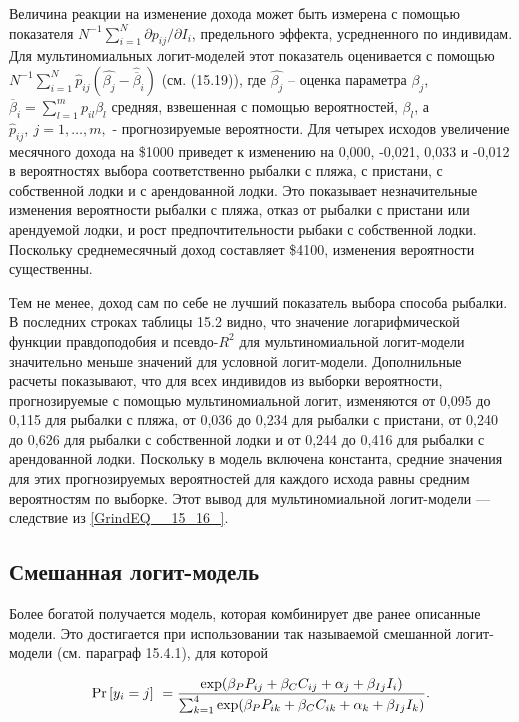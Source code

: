 Величина реакции на изменение дохода может быть измерена с помощью показателя $N^{-1}\sum^N_{i=1}{{\partial p_{ij}}/{\partial I_i}}$, предельного эффекта, усредненного по индивидам. Для мультиномиальных логит-моделей этот показатель оценивается с помощью $N^{-1}\sum^N_{i=1}{{\hat{p}}_{ij}(\widehat{{\beta }_j}-{\widehat{\overline{\beta }}}_i)}$ (см. (15.19)), где $\widehat{{\beta }_j}$ -- оценка параметра ${\beta }_j$, ${\overline{\beta }}_i=\sum^m_{l=1}{p_{il}{\beta }_l}$ средняя, взвешенная с помощью вероятностей, ${\beta }_l$, а ${\hat{p}}_{ij},\ j=1,\dots ,m,$ - прогнозируемые вероятности. Для четырех исходов увеличение месячного дохода на \$1000 приведет к изменению на 0,000, -0,021, 0,033 и -0,012 в вероятностях выбора соответственно рыбалки с пляжа, с пристани, с собственной лодки и с арендованной лодки. Это показывает незначительные изменения вероятности рыбалки с пляжа, отказ от рыбалки с пристани или арендуемой лодки, и рост предпочтительности рыбаки с собственной лодки. Поскольку среднемесячный доход составляет \$4100, изменения вероятности существенны.

Тем не менее, доход сам по себе не лучший показатель выбора способа рыбалки. В последних строках таблицы 15.2 видно, что значение логарифмической функции правдоподобия и псевдо-$R^2$ для мультиномиальной логит-модели значительно меньше значений для условной логит-модели. Дополнильные расчеты показывают, что для всех индивидов из выборки вероятности, прогнозируемые с помощью мультиномиальной логит, изменяются от 0,095 до 0,115 для рыбалки с пляжа, от 0,036 до 0,234 для рыбалки с пристани, от 0,240 до 0,626 для рыбалки с собственной лодки и от 0,244 до 0,416 для рыбалки с арендованной лодки. Поскольку в модель включена константа, средние значения для этих прогнозируемых вероятностей для каждого исхода равны средним вероятностям по выборке. Этот вывод для мультиномиальной логит-модели --- следствие из \eqref{GrindEQ__15_16_}.

\subsection{Смешанная логит-модель}

Более богатой получается модель, которая комбинирует две ранее описанные модели. Это  достигается при использовании так называемой смешанной логит-модели (см. параграф 15.4.1), для которой

\[{\Pr  \left[y_i=j\right]\ }=
\frac{{\rm exp}({\beta }_PP_{ij}+{\beta }_CC_{ij}+{\alpha }_j+{\beta }_{Ij}I_i)}
{\sum^4_{k=1}{{\rm exp}({\beta }_PP_{ik}+{\beta }_CC_{ik}+{\alpha }_k+{\beta }_{Ij}I_k)}}.\] 

